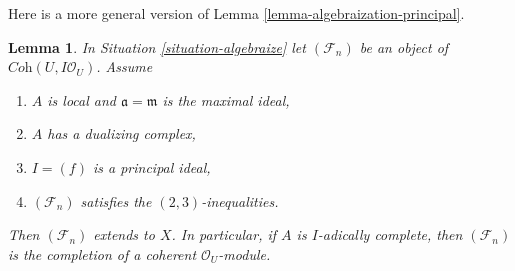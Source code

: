 \documentclass{stacks-project}
\theoremstyle{plain}
\newtheorem{lemma}[subsection]{Lemma}
\theoremstyle{definition}
\theoremstyle{remark}
\numberwithin{equation}{subsection}
\begin{document}
\noindent
Here is a more general version of Lemma \ref{lemma-algebraization-principal}.

\begin{lemma}
\label{lemma-algebraization-principal-bis}
In Situation \ref{situation-algebraize} let $(\mathcal{F}_n)$ be an object
of $\textit{Coh}(U, I\mathcal{O}_U)$. Assume
\begin{enumerate}
\item $A$ is local and $\mathfrak a = \mathfrak m$ is the maximal ideal,
\item $A$ has a dualizing complex,
\item $I = (f)$ is a principal ideal,
\item $(\mathcal{F}_n)$ satisfies the $(2, 3)$-inequalities.
\end{enumerate}
Then $(\mathcal{F}_n)$ extends to $X$. In particular, if $A$ is
$I$-adically complete, then $(\mathcal{F}_n)$ is the completion
of a coherent $\mathcal{O}_U$-module. 
\end{lemma}
\end{document}

